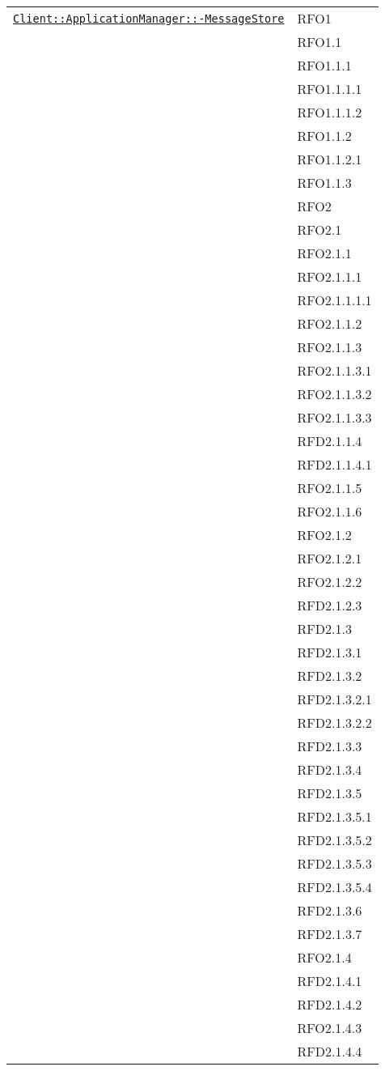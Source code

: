 \begin{longtable}{|>{\centering}m{10cm}|m{3cm}<{\centering}|}
\hyperref[Client::ApplicationManager::MessageStore]{\texttt{Client::ApplicationManager::-\linebreak MessageStore}} & RFO1\\
& RFO1.1\\
& RFO1.1.1\\
& RFO1.1.1.1\\
& RFO1.1.1.2\\
& RFO1.1.2\\
& RFO1.1.2.1\\
& RFO1.1.3\\
& RFO2\\
& RFO2.1\\
& RFO2.1.1\\
& RFO2.1.1.1\\
& RFO2.1.1.1.1\\
& RFO2.1.1.2\\
& RFO2.1.1.3\\
& RFO2.1.1.3.1\\
& RFO2.1.1.3.2\\
& RFO2.1.1.3.3\\
& RFD2.1.1.4\\
& RFD2.1.1.4.1\\
& RFO2.1.1.5\\
& RFO2.1.1.6\\
& RFO2.1.2\\
& RFO2.1.2.1\\
& RFO2.1.2.2\\
& RFD2.1.2.3\\
& RFD2.1.3\\
& RFD2.1.3.1\\
& RFD2.1.3.2\\
& RFD2.1.3.2.1\\
& RFD2.1.3.2.2\\
& RFD2.1.3.3\\
& RFD2.1.3.4\\
& RFD2.1.3.5\\
& RFD2.1.3.5.1\\
& RFD2.1.3.5.2\\
& RFD2.1.3.5.3\\
& RFD2.1.3.5.4\\
& RFD2.1.3.6\\
& RFD2.1.3.7\\
& RFO2.1.4\\
& RFD2.1.4.1\\
& RFD2.1.4.2\\
& RFO2.1.4.3\\
& RFD2.1.4.4\\

\end{longtable}
